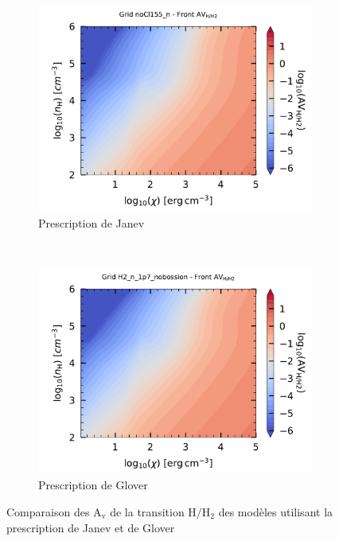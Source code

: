 \begin{appendices}
\begin{figure}[!p]  
    \centering
    \begin{subfigure}[t]{0.49\textwidth} %
        \centering \includegraphics[trim = {0 0 0 1cm },clip,width=1\textwidth]{figure/H2/grid_janev/HH2_AV.pdf}
        \caption{Prescription de Janev}
    \end{subfigure}
    ~ 
    \begin{subfigure}[t]{0.49\textwidth}
        \centering \includegraphics[trim = {0 0 0 1cm },clip,width=1\textwidth]{figure/H2/grid_glover/HH2_AV.pdf}
        \caption{Prescription de Glover}
    \end{subfigure}
    \caption{Comparaison des $\mathrm{A}_\mathrm{v}$ de la transition $\mathrm{H}/\mathrm{H}_2$ des modèles utilisant la prescription de Janev et de Glover}
    \label{fig:H2:JanevGlover:AVHH2}
\end{figure}
 

\end{appendices}
